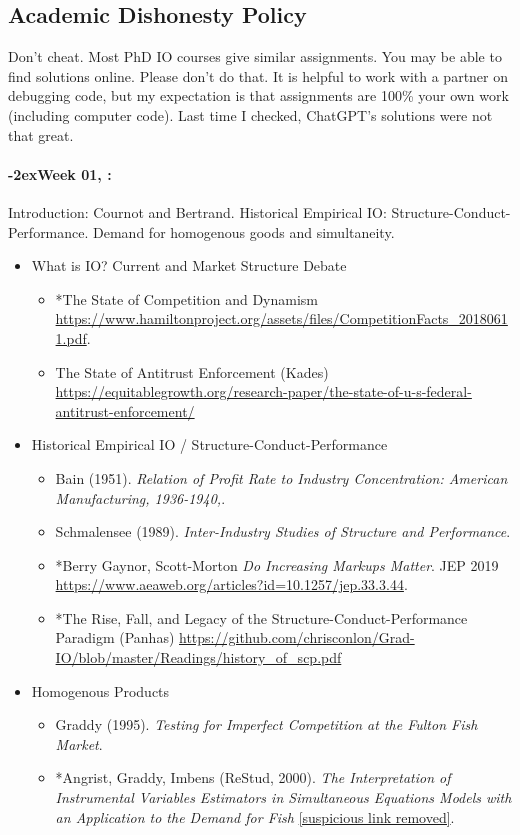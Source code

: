 \documentclass[11pt]{article}
\newcommand{\week}[1]{%
  \paragraph*{\kern-2ex\quad #1, \syldate{\today}:}%
  \AdvanceDate[7]%
}
\begin{document}
\subsection*{Academic Dishonesty Policy}
Don't cheat. Most PhD IO courses give similar assignments. You may be able to find solutions online. Please don't do that. It is helpful to work with a partner on debugging code, but my expectation is that assignments are 100\% your own work (including computer code). Last time I checked, ChatGPT's solutions were not that great.
\newpage
\SetDate[28/08/2025]
\week{Week 01} Introduction: Cournot and Bertrand. Historical Empirical IO: Structure-Conduct-Performance. Demand for homogenous goods and simultaneity.
\begin{itemize}
\item What is IO? Current and Market Structure Debate
\begin{itemize}
\item *The State of Competition and Dynamism \url{https://www.hamiltonproject.org/assets/files/CompetitionFacts_20180611.pdf}.
\item The State of Antitrust Enforcement (Kades) \url{https://equitablegrowth.org/research-paper/the-state-of-u-s-federal-antitrust-enforcement/}
\end{itemize}
\item Historical Empirical IO / Structure-Conduct-Performance
\begin{itemize}
\item Bain (1951). \textit{Relation of Profit Rate to Industry Concentration: American Manufacturing, 1936-1940,}.
\item Schmalensee (1989). \textit{Inter-Industry Studies of Structure and Performance}.
\item *Berry Gaynor, Scott-Morton \textit{Do Increasing Markups Matter}. JEP 2019 \url{https://www.aeaweb.org/articles?id=10.1257/jep.33.3.44}.
\item *The Rise, Fall, and Legacy of the Structure-Conduct-Performance Paradigm (Panhas) \url{https://github.com/chrisconlon/Grad-IO/blob/master/Readings/history_of_scp.pdf}
\end{itemize}
\item Homogenous Products
\begin{itemize}
\item Graddy (1995). \textit{Testing for Imperfect Competition at the Fulton Fish Market}.
\item *Angrist, Graddy, Imbens (ReStud, 2000). \textit{The Interpretation of Instrumental Variables Estimators in Simultaneous Equations Models with an Application to the Demand for Fish} \url{[suspicious link removed]}.
\end{itemize}
\end{itemize}
\end{document}
